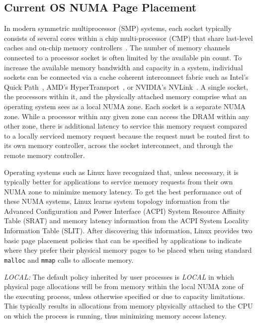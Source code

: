 \subsection{Current OS NUMA Page Placement}
\label{linux_background}
In modern symmetric multiprocessor (SMP) systems, each socket typically
consists of several {\color{black}cores} within a chip multi-processor (CMP) that share 
last-level caches and on-chip memory controllers~\cite{INTELXEON}. The number of
memory channels connected to a processor socket is often limited by the
available pin count.  To increase the available memory bandwidth and capacity 
in a system, individual sockets can be connected via a cache coherent interconnect 
fabric such as Intel's Quick Path~\cite{INTELQPI}, AMD's HyperTransport~\cite{AMDHT},
or NVIDIA's NVLink~\cite{NVLINK}.  A single socket, the processors
within it, and the physically attached memory comprise what an operating system
sees as a local NUMA zone.  Each socket is a separate NUMA zone. While a
processor within any given zone can access the DRAM within any other zone, there
is additional latency to service this memory request compared to a locally
serviced memory request because the request must be routed first to its
own memory controller, across the socket interconnect, and through the remote
memory controller.

Operating systems such as Linux have recognized that, unless necessary, it is
typically better for applications to service memory requests from their own
NUMA zone to minimize memory latency.  To get the best performance out of these NUMA
systems, Linux learns system topology information from the Advanced Configuration
and Power Interface (ACPI) System Resource
Affinity Table (SRAT) and memory latency information from the ACPI 
System Locality Information Table (SLIT)\@. After discovering this information,
Linux provides two basic page placement policies that can be specified by 
applications to indicate where they prefer their physical memory pages to be placed
when using standard {\tt malloc} and {\tt mmap} calls to allocate memory.

\emph{LOCAL:} The default policy inherited by user processes is
\emph{LOCAL} in which physical page allocations will be from memory within the 
local NUMA zone of the executing process, unless otherwise specified or due to capacity
limitations.  This typically results in allocations from memory
physically attached to the CPU on which the process is running, thus minimizing
memory access latency.

